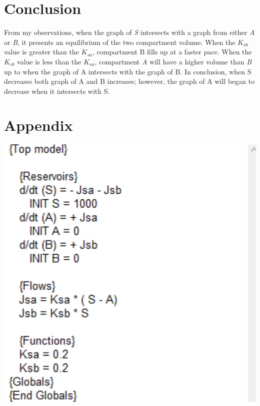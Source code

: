\documentclass [12pt] {article}
\begin{document}
\section{Conclusion}
From my observations, when the graph of \textit{S} intersects with a graph from either \textit{A} or \textit{B}, it presents an equilibrium of the two compartment volume. When the $K_{sb}$ value is greater than the $K_{sa}$, compartment B fills up at a faster pace.  When the $K_{sb}$ value is less than the $K_{sa}$, compartment \textit{A} will have a higher volume than \textit{B} up to when the graph of A intersects with the graph of B. In conclusion, when S decreases both graph of A and B increases; however, the graph of A will began to decrease when it intersects with S.
\newpage

\section{Appendix}
% 
% 

% 
\includegraphics[scale=2.0]{compartment_equations.PNG}
\end{document}
